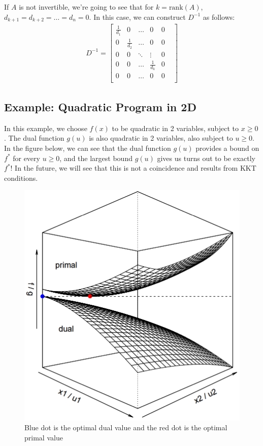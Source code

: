 \documentclass[11pt]{article}
\begin{document}
If $A$ is not invertible, we're going to see that for $k = \text{rank}(A)$,
$d_{k+1} = d_{k+2} = \dots = d_n = 0$. In this case, we can construct $D^{-1}$ as follows:
\begin{align*}
D^{-1} = \begin{bmatrix}
\frac{1}{d_1} & 0 & \dots & 0 & 0\\
0 & \frac{1}{d_2} & \dots & 0 & 0\\
0 & 0 & \ddots & \vdots & 0 &\\
0 & 0 & \dots & \frac{1}{d_k} & 0 \\
0 & 0 & \dots & 0 & 0 \\
\end{bmatrix}
\end{align*}

\subsection{Example: Quadratic Program in 2D}
\label{sec:exampl-quadr-progr}

In this example, we choose $f(x)$ to be quadratic in 2 variables, subject to $ x \geq 0$. The dual function $g(u)$ is also quadratic in 2 variables, also subject to $u \geq 0$. In the figure below, we can see that the dual function $g(u)$ provides a bound on $f^*$ for every $u \geq 0$, and the largest bound $g(u)$ gives us turns out to be exactly $f^*$! In the future, we will see that this is not a coincidence and results from KKT conditions.

\begin{figure}[h]
  \centering
  \includegraphics[scale=0.3]{quad.png}
  \caption{Blue dot is the optimal dual value and the red dot is the optimal primal value}
  \label{fig:quad}
\end{figure}
\end{document}
